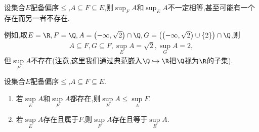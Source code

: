 \begin{remark}{}{}
	设集合$E$配备偏序$\leq$,$A\subseteq F\subseteq E$,则$\sup_{F}A$和$\sup_{E}A$不一定相等,甚至可能有一个存在而另一者不存在.
	
	例如,取$E=\R,F=\Q,A=\left(-\infty,\sqrt{2}\right)\cap\Q,G=\left(\left(-\infty,\sqrt{2}\right)\cup\left\{2\right\}\right)\cap\Q$,则
	\begin{align*}
		A\subseteq F,G\subseteq F,\sup_{E}A=\sqrt{2},\sup_{G}A=2,
	\end{align*}
	但$\sup\limits_{F}A$不存在(注意,这里我们通过典范嵌入$\Q\hookrightarrow\R$把$\Q$视为$\R$的子集).
\end{remark}

\begin{proposition}{}{}
	设集合$E$配备偏序$\leq$,$A\subseteq F\subseteq E$.
	\begin{enumerate}
		\item 若$\sup\limits_{E}A$和$\sup\limits_{F}A$都存在,则$\sup\limits_{E}A\leq\sup\limits_{A}F$.
		\item 若$\sup\limits_{E}A$存在且属于$F$,则$\sup\limits_{F}A$存在且等于$\sup\limits_{E}A$.
	\end{enumerate}
\end{proposition}






























































